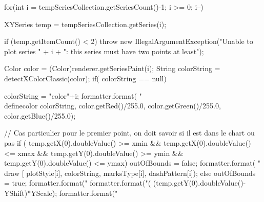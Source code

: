 \begin{code}
\begin{hide}
{      for(int i = tempSeriesCollection.getSeriesCount()-1; i >= 0; i--) {
         XYSeries temp = tempSeriesCollection.getSeries(i);

         if (temp.getItemCount() < 2)
            throw new IllegalArgumentException("Unable to plot series " + i +
                                               ": this series must have two points at least");

         Color color = (Color)renderer.getSeriesPaint(i);
         String colorString = detectXColorClassic(color);
         if( colorString == null) {
            colorString = "color"+i;
            formatter.format( "\\definecolor{%
                              colorString, color.getRed()/255.0, color.getGreen()/255.0, color.getBlue()/255.0);
         }

         // Cas particulier pour le premier point, on doit savoir si il est dans le chart ou pas
         if (  temp.getX(0).doubleValue() >= xmin && temp.getX(0).doubleValue() <= xmax &&
               temp.getY(0).doubleValue() >= ymin && temp.getY(0).doubleValue() <= ymax) {
            outOfBounds = false;
            formatter.format( "\\draw [%
                              plotStyle[i], colorString, marksType[i], dashPattern[i]);
         }
         else {
            outOfBounds = true;
            formatter.format("%
         }
         formatter.format("(%
                                              (temp.getY(0).doubleValue()-YShift)*YScale);
         formatter.format(" %

}}}
\end{hide}
\end{code}
